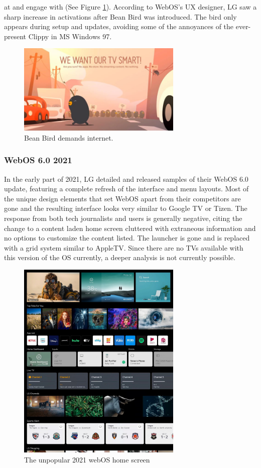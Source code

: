 \documentclass[12pt, letterpaper]{article}
\begin{document}
at and engage with (See Figure \ref{Bean_Bird}).  According to WebOS's UX designer, LG saw a sharp increase in activations after Bean Bird was introduced.  The bird only appears during setup and updates, avoiding some of the annoyances of the ever-present Clippy in MS Windows 97.
\begin{figure}[h]
    \centering
    \includegraphics[width=0.7\textwidth]{lg_bean_bird_dialogue.jpg}
    \caption{Bean Bird demands internet\cite{damir_2014}.}
    \label{Bean_Bird}
\end{figure}
\newpage
\subsubsection{WebOS 6.0 2021}
In the early part of 2021, LG detailed and released samples of their WebOS 6.0 update, featuring a complete refresh of the interface and menu layouts. Most of the unique design elements that set WebOS apart from their competitors are gone and the resulting interface looks very similar to Google TV or Tizen.  
The response from both tech journalists and users is generally negative, citing the change to a content laden home screen cluttered with extraneous information and no options to customize the content listed. The launcher is gone and is replaced with a grid system similar to AppleTV. Since there are no TVs available with this version of the OS currently, a deeper analysis is not currently possible.
\begin{figure}[h]
    \centering
    \includegraphics[width=0.7\textwidth]{LGwebos6.jpg}
    \caption{The unpopular 2021 webOS home screen}
\end{figure}
\end{document}
